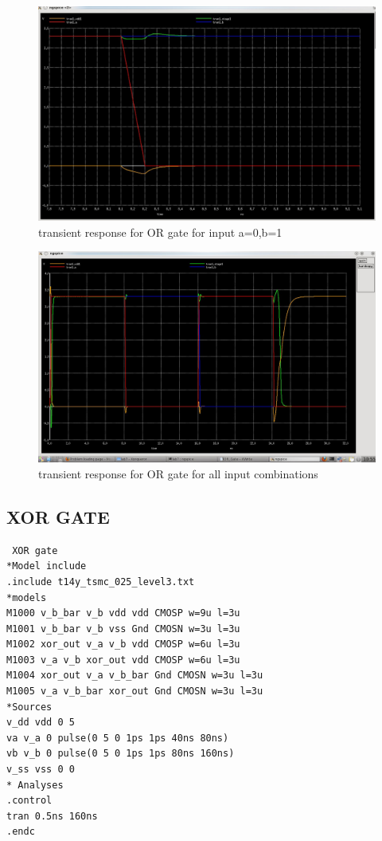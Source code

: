 \documentclass[12pt,a4paper]{article}
\begin{document}
\begin{center}
\begin{figure}[h]
\centering
\includegraphics[scale=.43]{OR_Gate_01.jpeg}
\caption[Short]{transient response for OR gate for input a=0,b=1 }
\end{figure}

\begin{figure}[h]
\centering
\includegraphics[scale=.4]{OR_Gate_All_Combinations.jpeg}
\caption[Short]{transient response for OR gate for all input combinations }
\end{figure}
\clearpage
\subsection{XOR GATE}
\begin{lstlisting}
 XOR gate
*Model include
.include t14y_tsmc_025_level3.txt
*models
M1000 v_b_bar v_b vdd vdd CMOSP w=9u l=3u
M1001 v_b_bar v_b vss Gnd CMOSN w=3u l=3u
M1002 xor_out v_a v_b vdd CMOSP w=6u l=3u
M1003 v_a v_b xor_out vdd CMOSP w=6u l=3u
M1004 xor_out v_a v_b_bar Gnd CMOSN w=3u l=3u
M1005 v_a v_b_bar xor_out Gnd CMOSN w=3u l=3u
*Sources
v_dd vdd 0 5
va v_a 0 pulse(0 5 0 1ps 1ps 40ns 80ns)
vb v_b 0 pulse(0 5 0 1ps 1ps 80ns 160ns)
v_ss vss 0 0
* Analyses
.control
tran 0.5ns 160ns
.endc
\end{lstlisting}


\end{center}
\end{document}
